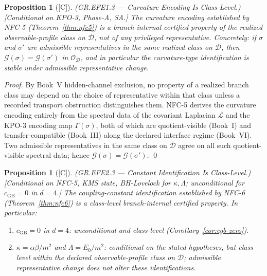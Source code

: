 \documentclass[12pt,oneside]{amsbook}
\theoremstyle{plain}
\newtheorem{proposition}[theorem]{Proposition}
\theoremstyle{definition}
\theoremstyle{remark}
\newcommand{\status}[1]{\textup{[#1]}}
\begin{document}
\begin{proposition}[\status{C}]\label{prop:EFE1-class-level}
\textup{(GR.EFE1.3 --- Curvature Encoding Is Class-Level.)}
\textup{[Conditional on KPO-3, Phase-A, SA.]}
The curvature encoding established by NFC-5
(Theorem~\ref{thm:nfc5}) is a branch-internal certified property of
the realized observable-profile class on $\mathcal{D}$, not of any
privileged representative. Concretely: if $\sigma$ and $\sigma'$ are
admissible representatives in the same realized class on $\mathcal{D}$,
then $\mathcal{G}(\sigma) = \mathcal{G}(\sigma')$ in
$\mathcal{O}_{\mathcal{D}}$, and in particular the curvature-type
identification is stable under admissible representative change.
\end{proposition}

\begin{proof}
By Book~V hidden-channel exclusion, no property of a realized branch
class may depend on the choice of representative within that class
unless a recorded transport obstruction distinguishes them. NFC-5
derives the curvature encoding entirely from the spectral data of the
covariant Laplacian $\mathcal{L}$ and the KPO-3 encoding map
$\Gamma(\sigma)$, both of which are quotient-visible (Book~I) and
transfer-compatible (Book~III) along the declared interface regime
(Book~VI). Two admissible representatives in the same class on
$\mathcal{D}$ agree on all such quotient-visible spectral data;
hence $\mathcal{G}(\sigma) = \mathcal{G}(\sigma')$. \qed
\end{proof}

\begin{proposition}[\status{C}]\label{prop:EFE2-class-level}
\textup{(GR.EFE2.3 --- Constant Identification Is Class-Level.)}
\textup{[Conditional on NFC-5, KMS state, BH-Lovelock for
$\kappa,\Lambda$; unconditional for $c_{\mathrm{GB}}=0$ in $d=4$.]}
The coupling-constant identification established by NFC-6
(Theorem~\ref{thm:nfc6}) is a class-level branch-internal certified
property. In particular:
\begin{enumerate}[label=\textup{(\alph*)}]
 \item $c_{\mathrm{GB}} = 0$ in $d=4$: unconditional and class-level
 (Corollary~\ref{cor:cgb-zero}).
 \item $\kappa = \alpha\beta/m^2$ and $\Lambda = E_0/m^2$: conditional
 on the stated hypotheses, but class-level within the declared
 observable-profile class on $\mathcal{D}$; admissible
 representative change does not alter these identifications.
\end{enumerate}
\end{proposition}
\end{document}
